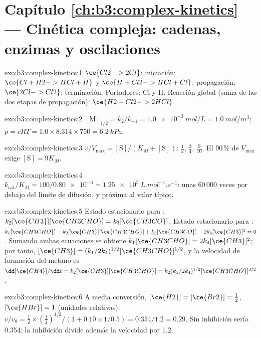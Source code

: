 \section*{Capítulo \ref{ch:b3:complex-kinetics} --- Cinética compleja: cadenas, enzimas y oscilaciones}

\begin{solution}{exo:b3:complex-kinetics:1}
$\ce{Cl2 -> 2 Cl}$: iniciación; $\ce{Cl + H2 -> HCl + H}$ y $\ce{H + Cl2 -> HCl + Cl}$:
propagación; $\ce{2 Cl -> Cl2}$: terminación. Portadores: Cl y H. Reacción global (suma de las
dos etapas de propagación): $\ce{H2 + Cl2 -> 2 HCl}$.
\end{solution}

\begin{solution}{exo:b3:complex-kinetics:2}
$[\mathrm M]_{1/2} = k_2/k_{-1} = \qty{1.0e-3}{mol/L} = \qty{1.0}{mol/m^3}$; $p = cRT = 1.0 \times 8.314 \times 750 =
\qty{6.2}{kPa}$.
\end{solution}

\begin{solution}{exo:b3:complex-kinetics:3}
$v/V_{\max} = [\mathrm S]/(K_M + [\mathrm S])$: $\frac12$, $\frac34$, $\frac{9}{10}$. El 90\,\% de $V_{\max}$ exige $[\mathrm S] = 9K_M$.
\end{solution}

\begin{solution}{exo:b3:complex-kinetics:4}
$k_{\mathrm{cat}}/K_M = 100/\num{0.80e-3} = \qty{1.25e5}{L.mol^{-1}.s^{-1}}$: unas 60\,000 veces por debajo del límite de
difusión, y próxima al valor típico.
\end{solution}

\begin{solution}{exo:b3:complex-kinetics:5}
Estado estacionario para : $k_2[\ce{CH3}][\ce{CH3CHO}] = k_3[\ce{CH3CO}]$. Estado estacionario para :
$k_1[\ce{CH3CHO}] - k_2[\ce{CH3}][\ce{CH3CHO}] + k_3[\ce{CH3CO}] - 2k_4[\ce{CH3}]^2 = 0$. Sumando ambas ecuaciones se obtiene $k_1[\ce{CH3CHO}] =
2k_4[\ce{CH3}]^2$; por tanto, $[\ce{CH3}] = (k_1/2k_4)^{1/2}[\ce{CH3CHO}]^{1/2}$, y la velocidad de formación del metano es
$\dd[\ce{CH4}]/\dd t = k_2[\ce{CH3}][\ce{CH3CHO}] =
k_2(k_1/2k_4)^{1/2}[\ce{CH3CHO}]^{3/2}$.
\end{solution}

\begin{solution}{exo:b3:complex-kinetics:6}
A media conversión, $[\ce{H2}] = [\ce{Br2}] = \frac12$, $[\ce{HBr}] = 1$ (unidades relativas):
$v/v_0 = \frac12 \times (\frac12)^{1/2}/(1 + 0.10 \times 1/0.5) = 0.354/1.2 = 0.29$. Sin inhibición sería
0.354: la inhibición divide además la velocidad por 1.2.
\end{solution}

